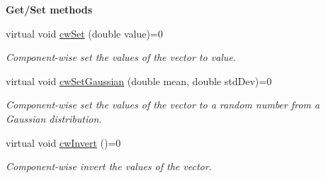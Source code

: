 \begin{Indent}{\bf Get/\-Set methods}\par
\begin{DoxyCompactItemize}
\item 
virtual void \hyperlink{class_q_u_e_s_o_1_1_vector_a6ba2d1451b70dbae76802181025df159}{cw\-Set} (double value)=0
\begin{DoxyCompactList}\small\item\em Component-\/wise set the values of the vector to {\ttfamily value}. \end{DoxyCompactList}\item 
virtual void \hyperlink{class_q_u_e_s_o_1_1_vector_a44643b7d736001a7e0d0032ed8a7cef0}{cw\-Set\-Gaussian} (double mean, double std\-Dev)=0
\begin{DoxyCompactList}\small\item\em Component-\/wise set the values of the vector to a random number from a Gaussian distribution. \end{DoxyCompactList}\item 
virtual void \hyperlink{class_q_u_e_s_o_1_1_vector_a3d0d2998b1c2655e0df586e01fc622e8}{cw\-Invert} ()=0
\begin{DoxyCompactList}\small\item\em Component-\/wise invert the values of the vector. \end{DoxyCompactList}\end{DoxyCompactItemize}
\end{Indent}
